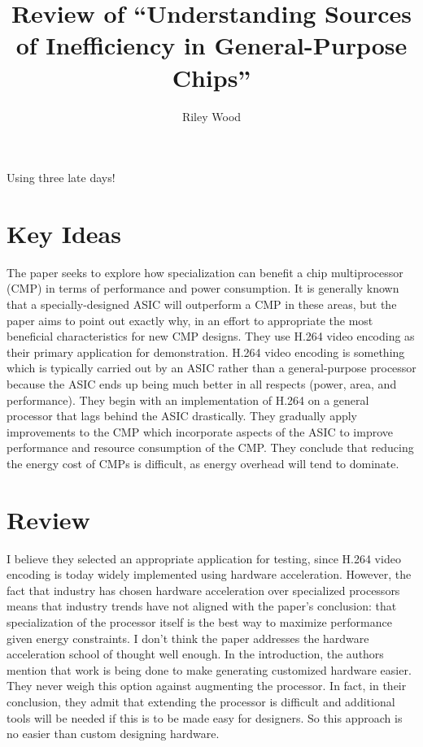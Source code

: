 \documentclass{article}
\title{Review of ``Understanding Sources of Inefficiency in General-Purpose
Chips'' \cite{review}}
\author{Riley Wood}
\begin{document}
\maketitle

Using three late days!

\section*{Key Ideas}
The paper seeks to explore how specialization can benefit a chip multiprocessor
(CMP) in terms of performance and power consumption. It is generally known that a
specially-designed ASIC will outperform a CMP in these areas, but the paper aims
to point out exactly why, in an effort to appropriate the most beneficial
characteristics for new CMP designs. They use H.264 video encoding as their
primary application for demonstration. H.264 video encoding is something which
is typically carried out by an ASIC rather than a general-purpose processor
because the ASIC ends up being much better in all respects (power, area, and
performance). They begin with an implementation of H.264 on a general processor
that lags behind the ASIC drastically. They gradually apply improvements to the
CMP which incorporate aspects of the ASIC to improve performance and
resource consumption of the CMP. They conclude that reducing the energy cost of
CMPs is difficult, as energy overhead will tend to dominate.

\section*{Review}
I believe they selected an appropriate application for testing, since H.264
video encoding is today widely implemented using hardware acceleration. However,
the fact that industry has chosen hardware acceleration over specialized
processors means that industry trends have not aligned with the paper's
conclusion: that specialization of the processor itself is the best way to
maximize performance given energy constraints. I don't think the paper addresses
the hardware acceleration school of thought well enough. In the introduction,
the authors mention that work is being done to make generating customized
hardware easier. They never weigh this option against augmenting the processor.
In fact, in their conclusion, they admit that extending the processor is
difficult and additional tools will be needed if this is to be made easy for
designers. So this approach is no easier than custom designing hardware.
\end{document}
